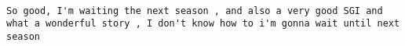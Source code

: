 \documentclass[
]{article}
\begin{document}
\begin{verbatim}
                                                                                                                                                                                                                                                                                                                                                                                                                                                                                                                                                                                                                                                                                                                                                                                                                                                                                                                                                                                                                                                                                                                                                                                                                                                                                                                                                                                                                                                                                                                                                                                                                                                                                                                                                                                                                                                                                                                                                                                                                                                                                                                                                                                                                                                                                                                                                                                                                                                                                                                                                                                                                                                                                                                                                                                                                                                                                                                                                                                                                                                                                                              So good, I'm waiting the next season , and also a very good SGI and what a wonderful story , I don't know how to i'm gonna wait until next season

\end{verbatim}
\end{document}
